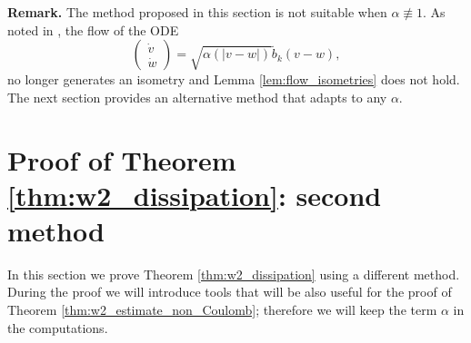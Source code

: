 \documentclass[11pt]{amsart}
\numberwithin{equation}{section}
\begin{document}
  


\textbf{Remark.}
The method proposed in this section is not suitable when $\alpha  \not\equiv 1$. As noted  in \cite{GS24},  the flow of the ODE
% 
\begin{equation*}
  \begin{pmatrix}\dot{v}\\
    \dot{w}
  \end{pmatrix}=
 \sqrt{ \alpha\left(|v-w|\right)}\tilde{b}_{k}\left(v-w\right),
\end{equation*}
no longer generates an isometry and Lemma \ref{lem:flow_isometries} does not hold. The next section provides an alternative method that adapts to any $\alpha$. 





\section{Proof of Theorem \ref{thm:w2_dissipation}: second method}\label{sec:w2_method2}
% 

In this section we prove Theorem \ref{thm:w2_dissipation} using a different method. During the proof we will introduce tools that will be also useful for the proof of Theorem \ref{thm:w2_estimate_non_Coulomb}; therefore we will keep the term $\alpha$ in the computations. 
\end{document}
